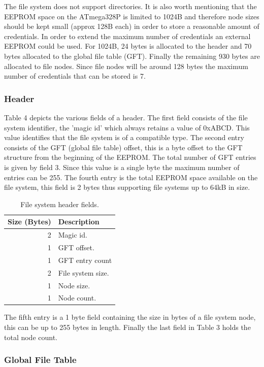 The file system does not support directories. It is also worth mentioning that the EEPROM space on the ATmega328P is limited to 1024B and therefore node sizes should be kept small (approx 128B each) in order to store a reasonable amount of credentials. In order to extend the maximum number of credentials an external EEPROM could be used. For 1024B, 24 bytes is allocated to the header and 70 bytes allocated to the global file table (GFT). Finally the remaining 930 bytes are allocated to file nodes. Since file nodes will be around 128 bytes the maximum number of credentials that can be stored is 7.

\subsubsection{Header}
Table 4 depicts the various fields of a header. The first field consists of the file system identifier, the 'magic id' which always retains a value of 0xABCD. This value identifies that the file system is of a compatible type. The second entry consists of the GFT (global file table) offset, this is a byte offset to the GFT structure from the beginning of the EEPROM. The total number of GFT entries is given by field 3. Since this value is a single byte the maximum number of entries can be 255. The fourth entry is the total EEPROM space available on the file system, this field is 2 bytes thus supporting file systems up to 64kB in size. 
\begin{table}[H]
\centering
\begin{tabular}{|r|l|}
\hline
\multicolumn{1}{|l|}{\textbf{Size (Bytes)}} &  \textbf{Description} \\ \hline
2 & Magic id. \\ \hline
1 & GFT offset.\\ \hline
1 & GFT entry count\\ \hline
2 & File system size. \\ \hline
1 & Node size.\\ \hline
1 & Node count. \\ \hline

\end{tabular}
\caption{File system header fields.}
\label{tbl:HWSWRequirements}
\end{table}

The fifth entry is a 1 byte field containing the size in bytes of a file system node, this can be up to 255 bytes in length. Finally the last field in Table 3 holds the total node count.
\subsubsection{Global File Table}

